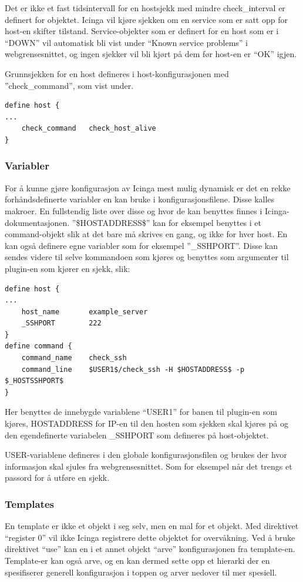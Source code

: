 Det er ikke et fast tidsintervall for en hostsjekk med mindre check\_interval er definert for objektet. Icinga vil kjøre sjekken om en service som er satt opp for host-en skifter tilstand. Service-objekter som er definert for en host som er i ``DOWN'' vil automatisk bli vist under ``Known service problems'' i webgrensesnittet, og ingen sjekker vil bli kjørt på dem før host-en er ``OK'' igjen.

Grunnsjekken for en host defineres i host-konfigurasjonen med ''check\_command'', som vist under.
\begin{lstlisting}[style=example]
define host {
...
    check_command	check_host_alive
}
\end{lstlisting}

\subsubsection{Variabler}
For å kunne gjøre konfigurasjon av Icinga mest mulig dynamisk er det en rekke forhåndsdefinerte variabler en kan bruke i konfigurasjonsfilene. Disse kalles makroer. En fullstendig liste over disse og hvor de kan benyttes finnes i Icinga-dokumentasjonen\cite{icingamacro}. ''\$HOSTADDRESS\$'' kan for eksempel benyttes i et command-objekt slik at det bare må skrives en gang, og ikke for hver host. En kan også definere egne variabler som for eksempel ''\_SSHPORT''. Disse kan sendes videre til selve kommandoen som kjøres og benyttes som argumenter til plugin-en som kjører en sjekk, slik:
\begin{lstlisting}[style=example]
define host {
...
    host_name		example_server
    _SSHPORT		222
}
define command {
    command_name	check_ssh
    command_line	$USER1$/check_ssh -H $HOSTADDRESS$ -p $_HOSTSSHPORT$
}
\end{lstlisting}

Her benyttes de innebygde variablene ``USER1'' for banen til plugin-en som kjøres, HOSTADDRESS for IP-en til den hosten som sjekken skal kjøres på og den egendefinerte variabelen \_SSHPORT som defineres på host-objektet.

USER-variablene defineres i den globale konfigurasjonsfilen og brukes der hvor informasjon skal sjules fra webgrensesnittet. Som for eksempel når det trengs et passord for å utføre en sjekk.

\subsubsection{Templates}
En template er ikke et objekt i seg selv, men en mal for et objekt. Med direktivet ``register 0'' vil ikke Icinga registrere dette objektet for overvåkning. Ved å bruke direktivet ``use'' kan en i et annet objekt ``arve'' konfigurasjonen fra template-en. Template-er kan også arve, og en kan dermed sette opp et hierarki der en spesifiserer generell konfigurasjon i toppen og arver nedover til mer spesiell. 

